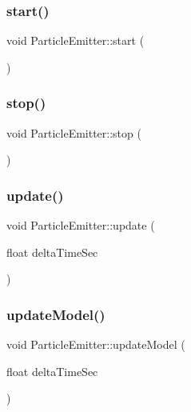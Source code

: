 \subsubsection{\texorpdfstring{start()}{start()}}
{\footnotesize\ttfamily void Particle\+Emitter\+::start (\begin{DoxyParamCaption}{ }\end{DoxyParamCaption})}

\hypertarget{class_mason_1_1_particle_emitter_a4843aa3afd1c4d49c9c2519837fffe81}{}\label{class_mason_1_1_particle_emitter_a4843aa3afd1c4d49c9c2519837fffe81} 
\subsubsection{\texorpdfstring{stop()}{stop()}}
{\footnotesize\ttfamily void Particle\+Emitter\+::stop (\begin{DoxyParamCaption}{ }\end{DoxyParamCaption})}

\hypertarget{class_mason_1_1_particle_emitter_a34da56b84fe4810c701f4b1541e079dc}{}\label{class_mason_1_1_particle_emitter_a34da56b84fe4810c701f4b1541e079dc} 
\subsubsection{\texorpdfstring{update()}{update()}}
{\footnotesize\ttfamily void Particle\+Emitter\+::update (\begin{DoxyParamCaption}\item[{float}]{delta\+Time\+Sec }\end{DoxyParamCaption})}

\hypertarget{class_mason_1_1_particle_emitter_a00459b3ebe215bede4427ad1e8e3f7dc}{}\label{class_mason_1_1_particle_emitter_a00459b3ebe215bede4427ad1e8e3f7dc} 
\subsubsection{\texorpdfstring{update\+Model()}{updateModel()}}
{\footnotesize\ttfamily void Particle\+Emitter\+::update\+Model (\begin{DoxyParamCaption}\item[{float}]{delta\+Time\+Sec }\end{DoxyParamCaption})\hspace{0.3cm}{\ttfamily [protected]}}



